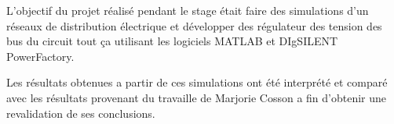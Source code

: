 L'objectif du projet réalisé pendant le stage était faire des simulations d'un réseaux de distribution électrique et développer des régulateur des tension des bus du circuit tout ça utilisant les logiciels MATLAB et DIgSILENT PowerFactory.

Les résultats obtenues a partir de ces simulations ont été interprété et comparé avec les résultats provenant du travaille de Marjorie Cosson \cite{cosson:tel-01374469} a fin d'obtenir une revalidation de ses conclusions.   
\pagebreak


